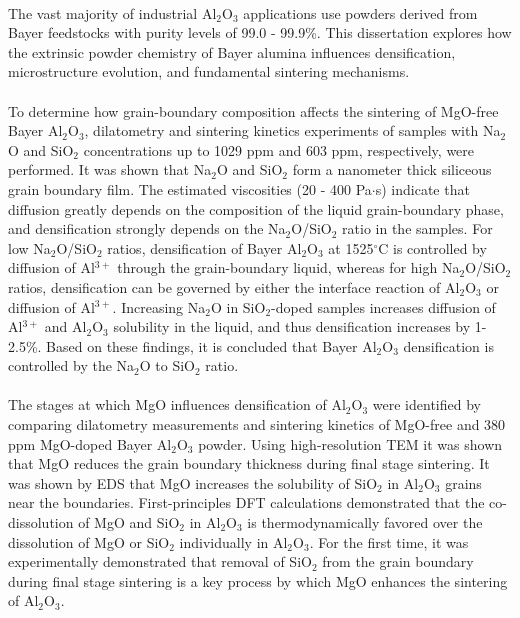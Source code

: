 \paragraph*{} The vast majority of industrial Al$_{2}$O$_{3}$ applications use powders derived from Bayer feedstocks with purity levels of 99.0 - 99.9\%. This dissertation explores how the extrinsic powder chemistry of Bayer alumina influences densification, microstructure evolution, and fundamental sintering mechanisms.
\paragraph*{} To determine how grain-boundary composition affects the sintering of MgO-free Bayer Al$_{2}$O$_{3}$, dilatometry and sintering kinetics experiments of samples with Na$_{2}$O and SiO$_{2}$ concentrations up to 1029 ppm and 603 ppm, respectively, were performed. It was shown that Na$_{2}$O and SiO$_{2}$ form a nanometer thick siliceous grain boundary film. The estimated viscosities (20 - 400 Pa$\cdot$s) indicate that diffusion greatly depends on the composition of the liquid grain-boundary phase, and densification strongly depends on the Na$_{2}$O/SiO$_{2}$ ratio in the samples. For low Na$_{2}$O/SiO$_{2}$ ratios, densification of Bayer Al$_{2}$O$_{3}$ at 1525$^{\circ}$C is controlled by diffusion of Al$^{3+}$ through the grain-boundary liquid, whereas for high Na$_{2}$O/SiO$_{2}$ ratios, densification can be governed by either the interface reaction of Al$_{2}$O$_{3}$ or diffusion of Al$^{3+}$. Increasing Na$_{2}$O in SiO$_{2}$-doped samples increases diffusion of Al$^{3+}$ and Al$_{2}$O$_{3}$ solubility in the liquid, and thus densification increases by 1-2.5\%. Based on these findings, it is concluded that Bayer Al$_{2}$O$_{3}$ densification is controlled by the Na$_{2}$O to SiO$_{2}$ ratio. 
\paragraph*{} The stages at which MgO influences densification of Al$_{2}$O$_{3}$ were identified by comparing dilatometry measurements and sintering kinetics of MgO-free and 380 ppm MgO-doped Bayer Al$_{2}$O$_{3}$ powder. Using high-resolution TEM it was shown that MgO reduces the grain boundary thickness during final stage sintering. It was shown by EDS that MgO increases the solubility of SiO$_{2}$ in Al$_{2}$O$_{3}$ grains near the boundaries. First-principles DFT calculations demonstrated that the co-dissolution of MgO and SiO$_{2}$ in Al$_{2}$O$_{3}$ is thermodynamically favored over the dissolution of MgO or SiO$_{2}$ individually in Al$_{2}$O$_{3}$. For the first time, it was experimentally demonstrated that removal of SiO$_{2}$ from the grain boundary during final stage sintering is a key process by which MgO enhances the sintering of Al$_{2}$O$_{3}$. 
